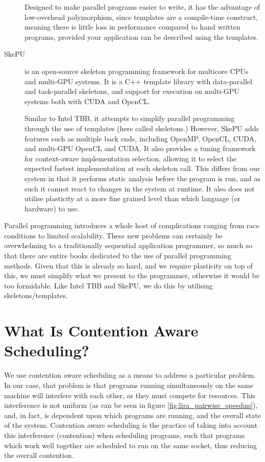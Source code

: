 \begin{description}
Designed to make parallel programs easier to write, it has the advantage of low-overhead polymorphism, since templates are a compile-time construct, meaning there is little loss in performance compared to hand written programs, provided your application can be described using the templates.

\item[SkePU] is an open-source skeleton programming framework for multicore CPUs and multi-GPU systems. It is a C++ template library with data-parallel and task-parallel skeletons, and support for execution on multi-GPU systems both with CUDA and OpenCL.

Similar to Intel TBB, it attempts to simplify parallel programming through the use of templates (here called skeletons.) However, SkePU adds features such as multiple back ends, including OpenMP, OpenCL, CUDA, and multi-GPU OpenCL and CUDA. It also provides a tuning framework for context-aware implementation selection, allowing it to select the expected fastest implementation at each skeleton call. This differs from our system in that it performs static analysis before the program is run, and as such it cannot react to changes in the system at runtime. It also does not utilise plasticity at a more fine grained level than which language (or hardware) to use.
\end{description}



Parallel programming introduces a whole host of complications ranging from race conditions to limited scalability. These new problems can certainly be overwhelming to a traditionally sequential application programmer, so much so that there are entire books dedicated to the use of parallel programming methods. Given that this is already so hard, and we require plasticity on top of this, we must simplify what we present to the programmer, otherwise it would be too formidable. Like Intel TBB and SkePU, we do this by utilising skeletons/templates.



\section{What Is Contention Aware Scheduling?}
\label{section:background:what_is_contention_aware_scheduling}

We use contention aware scheduling as a means to address a particular problem. In our case, that problem is that programs running simultaneously on the same machine will interfere with each other, as they must compete for resources. This interference is not uniform (as can be seen in figure \ref{fig:lira_pairwise_speedup}), and, in fact, is dependent upon which programs are running, and the overall state of the system. Contention aware scheduling is the practice of taking into account this interference (contention) when scheduling programs, such that programs which work well together are scheduled to run on the same socket, thus reducing the overall contention.

